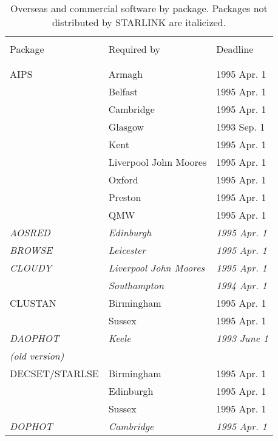\begin{table}
\begin{center}
\caption{Overseas and commercial software by package.
Packages not distributed by STARLINK are italicized.}
\vspace{5mm}
\begin{tabular}{|p{36mm}|p{50mm}|p{30mm}|} \hline \label{t_OCpack}
& & \\
Package & Required by & Deadline \\
& & \\ \hline
& & \\
AIPS                  & Armagh           & 1995 Apr. 1 \\
                      & Belfast          & 1995 Apr. 1 \\
                      & Cambridge        & 1995 Apr. 1 \\
                      & Glasgow          & 1993 Sep. 1 \\
                      & Kent             & 1995 Apr. 1 \\
                      & Liverpool John Moores & 1995 Apr. 1 \\
                      & Oxford           & 1995 Apr. 1 \\
                      & Preston          & 1995 Apr. 1 \\
                      & QMW              & 1995 Apr. 1 \\
{\em AOSRED}          & {\em Edinburgh}  & {\em 1995 Apr. 1} \\
{\em BROWSE}          & {\em Leicester}  & {\em 1995 Apr. 1} \\
{\em CLOUDY}          & {\em Liverpool John Moores} & {\em 1995 Apr. 1} \\
                      & {\em Southampton} & {\em 1994 Apr. 1} \\
CLUSTAN               & Birmingham       & 1995 Apr. 1 \\
                      & Sussex           & 1995 Apr. 1 \\
{\em DAOPHOT}         & {\em Keele}      & {\em 1993 June 1} \\
{\em (old version)}   &                  & \\
DECSET/STARLSE        & Birmingham       & 1995 Apr. 1 \\
                      & Edinburgh        & 1995 Apr. 1 \\
                      & Sussex           & 1995 Apr. 1 \\
{\em DOPHOT}          & {\em Cambridge}  & {\em 1995 Apr. 1} \\

\end{tabular}
\end{center}
\end{table}
